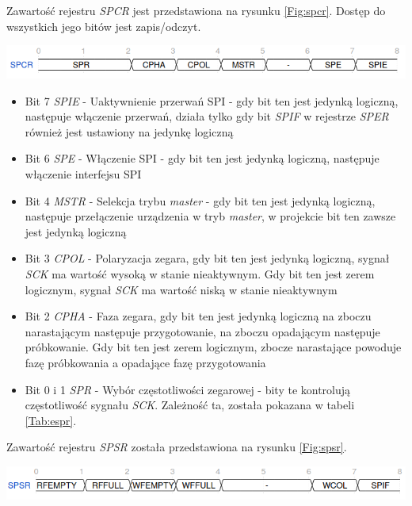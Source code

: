 \documentclass[11pt,a4paper]{article}
\begin{document}
\\\\
Zawartość rejestru \textit{SPCR} jest przedstawiona na rysunku \ref{Fig:spcr}. Dostęp do wszystkich jego bitów jest zapis/odczyt.\\
\begin{minipage}[c]{\textwidth}
					\includegraphics[width=\textwidth]{./rysunki/spcr.png}
			\end{minipage} 
			\begin{itemize}
				\item Bit 7 \textit{SPIE} - Uaktywnienie przerwań SPI - gdy bit ten jest jedynką logiczną, następuje włączenie przerwań, działa tylko gdy bit \textit{SPIF} w rejestrze \textit{SPER} również jest ustawiony na jedynkę logiczną
				\item Bit 6 \textit{SPE} - Włączenie SPI - gdy bit ten jest jedynką logiczną, następuje włączenie interfejsu SPI
				\item Bit 4 \textit{MSTR} - Selekcja trybu \textit{master} - gdy bit ten jest jedynką logiczną, następuje przełączenie urządzenia w tryb \textit{master}, w projekcie bit ten zawsze jest jedynką logiczną
				\item Bit 3 \textit{CPOL} - Polaryzacja zegara, gdy bit ten jest jedynką logiczną, sygnał \textit{SCK} ma wartość wysoką w stanie nieaktywnym. Gdy bit ten jest zerem logicznym, sygnał \textit{SCK} ma wartość niską w stanie nieaktywnym
				\item Bit 2 \textit{CPHA} - Faza zegara, gdy bit ten jest jedynką logiczną na zboczu narastającym następuje przygotowanie, na zboczu opadającym następuje próbkowanie. Gdy bit ten jest zerem logicznym, zbocze narastające powoduje fazę próbkowania a opadające fazę przygotowania
				\item Bit 0 i 1 \textit{SPR} - Wybór częstotliwości zegarowej - bity te kontrolują częstotliwość sygnału \textit{SCK}. Zależność ta, została pokazana w tabeli \ref{Tab:espr}.
			\end{itemize}
Zawartość rejestru \textit{SPSR} została przedstawiona na rysunku \ref{Fig:spsr}.\\
\begin{minipage}[c]{\textwidth}
					\includegraphics[width=\textwidth]{./rysunki/spsr.png}
			\end{minipage} 
\end{document}
